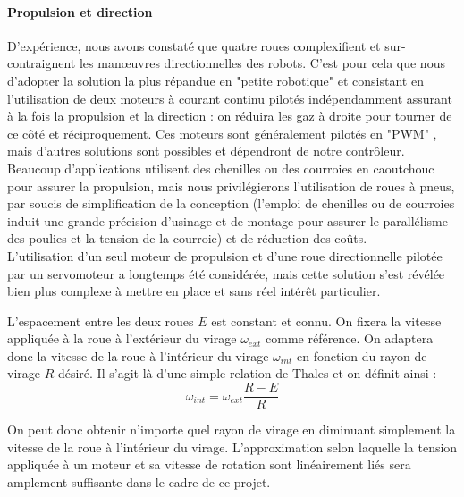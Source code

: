 		\paragraph{Propulsion et direction}

			D’expérience, nous avons constaté que quatre roues complexifient et sur-contraignent les manœuvres directionnelles des robots. C’est pour cela que nous d'adopter la solution la plus répandue en "petite robotique" et consistant en l'utilisation de deux moteurs à courant continu pilotés indépendamment assurant à la fois la propulsion et la direction : on réduira les gaz à droite pour tourner de ce côté et réciproquement. Ces moteurs sont généralement pilotés en "PWM" , mais d'autres solutions sont possibles et dépendront de notre contrôleur. Beaucoup d'applications utilisent des chenilles ou des courroies en caoutchouc pour assurer la propulsion, mais nous privilégierons l’utilisation de roues à pneus, par soucis de simplification de la conception (l'emploi de chenilles ou de courroies induit  une grande précision d'usinage et de montage pour assurer le parallélisme des poulies et la tension de la courroie) et de réduction des coûts.\\

			L'utilisation d'un seul moteur de propulsion et d'une roue directionnelle pilotée par un servomoteur a longtemps été considérée, mais cette solution s'est révélée bien plus complexe à mettre en place et sans réel intérêt particulier.\\


			L'espacement entre les deux roues $E$ est constant et connu.
			On fixera la vitesse appliquée à la roue à l'extérieur du virage $\omega_{ext}$ comme référence.
			On adaptera donc la vitesse de la roue à l'intérieur du virage $\omega_{int}$ en fonction du rayon de virage $R$ désiré.
			Il s'agit là d'une simple relation de Thales et on définit ainsi :
			\[\omega_{int} = \omega_{ext}\frac{R-E}{R}\]

			On peut donc obtenir n'importe quel rayon de virage en diminuant simplement la vitesse de la roue à l'intérieur du virage.
			L'approximation selon laquelle la tension appliquée à un moteur et sa vitesse de rotation sont linéairement liés sera amplement suffisante dans le cadre de ce projet.\\

